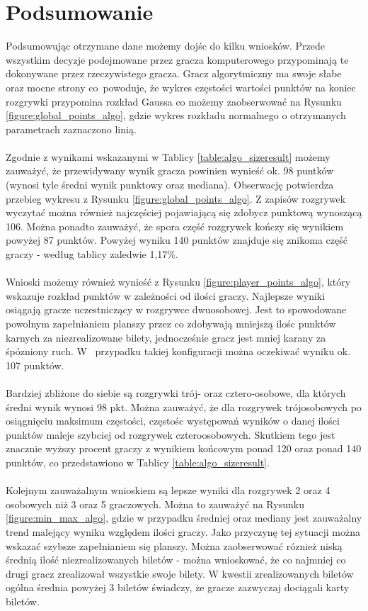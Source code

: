 \documentclass[12pt, oneside]{report}
\begin{document}
\section{Podsumowanie} 
Podsumowując otrzymane dane możemy dojśc do kilku wniosków. Przede wszystkim decyzje podejmowane przez gracza komputerowego przypominają te dokonywane przez rzeczywistego gracza. Gracz algorytmiczny ma swoje słabe oraz mocne strony co~powoduje, że wykres częstości wartości punktów na koniec rozgrywki przypomina rozkład Gaussa co możemy zaobserwować na Rysunku \ref{figure:global_points_algo}, gdzie wykres rozkładu normalnego o otrzymanych parametrach zaznaczono linią. \\ \\
Zgodnie z wynikami wskazanymi w Tablicy \ref{table:algo_sizeresult} możemy zauważyć, że przewidywany wynik gracza powinien wynieść ok. 98 puntków (wynosi tyle średni wynik punktowy oraz mediana). Obserwację potwierdza przebieg wykresu z Rysunku \ref{figure:global_points_algo}. Z zapisów rozgrywek wyczytać można również najczęściej pojawiającą się zdobycz punktową wynoszącą 106. Można  ponadto zauważyć, że spora część rozgrywek kończy się wynikiem powyżej 87 punktów. Powyżej wyniku 140 punktów znajduje się znikoma część graczy - według tablicy zaledwie 1,17\%. \\ \\ 
Wnioski możemy również wynieść z Rysunku \ref{figure:player_points_algo}, który wskazuje rozkład punktów w zależności od ilości graczy. Najlepsze wyniki osiągają gracze uczestniczący w rozgrywce dwuosobowej. Jest to spowodowane powolnym zapełnianiem planszy przez co zdobywają mniejszą ilośc punktów karnych za niezrealizowane bilety, jednocześnie gracz jest mniej karany za śpózniony ruch. W~ przypadku takiej konfiguracji można oczekiwać wyniku ok. 107 punktów. \\ \\ 
Bardziej zbliżone do siebie są rozgrywki trój- oraz cztero-osobowe, dla których średni wynik wynosi 98 pkt. Można zauważyć, że dla rozgrywek trójosobowych po osiągnięciu maksimum częstości, częstośc występowań wyników o danej ilości punktów maleje szybciej od rozgrywek czteroosobowych. Skutkiem tego jest znacznie wyższy procent graczy z wynikiem końcowym ponad 120 oraz ponad 140 punktów, co przedstawiono w Tablicy \ref{table:algo_sizeresult}. \\ \\
Kolejnym zauważalnym wnioskiem są lepsze wyniki dla rozgrywek 2 oraz 4 osobowych niż 3 oraz 5 graczowych. Można to zauważyć na Rysunku \ref{figure:min_max_algo}, gdzie w przypadku średniej oraz mediany jest zauważalny trend malejący wyniku względem ilości graczy. Jako przyczynę tej sytuacji można wskazać szybsze zapełnianiem się planszy. Można zaobserwować róznież niską średnią ilość niezrealizowanych biletów - można wnioskować, że co najmniej co drugi gracz zrealizował wszystkie swoje bilety. W kwestii zrealizowanych biletów ogólna średnia powyżej 3 biletów świadczy, że gracze zazwyczaj dociągali karty biletów. \\ \\
\end{document}
